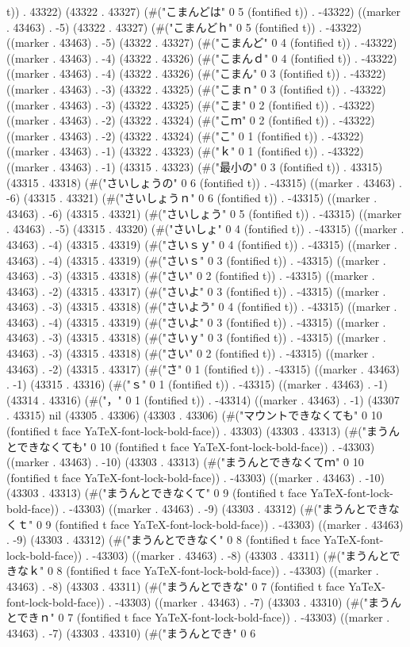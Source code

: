 t)) . 43322) (43322 . 43327) (#("こまんどは" 0 5 (fontified t)) . -43322) ((marker . 43463) . -5) (43322 . 43327) (#("こまんどｈ" 0 5 (fontified t)) . -43322) ((marker . 43463) . -5) (43322 . 43327) (#("こまんど" 0 4 (fontified t)) . -43322) ((marker . 43463) . -4) (43322 . 43326) (#("こまんｄ" 0 4 (fontified t)) . -43322) ((marker . 43463) . -4) (43322 . 43326) (#("こまん" 0 3 (fontified t)) . -43322) ((marker . 43463) . -3) (43322 . 43325) (#("こまｎ" 0 3 (fontified t)) . -43322) ((marker . 43463) . -3) (43322 . 43325) (#("こま" 0 2 (fontified t)) . -43322) ((marker . 43463) . -2) (43322 . 43324) (#("こｍ" 0 2 (fontified t)) . -43322) ((marker . 43463) . -2) (43322 . 43324) (#("こ" 0 1 (fontified t)) . -43322) ((marker . 43463) . -1) (43322 . 43323) (#("ｋ" 0 1 (fontified t)) . -43322) ((marker . 43463) . -1) (43315 . 43323) (#("最小の" 0 3 (fontified t)) . 43315) (43315 . 43318) (#("さいしょうの" 0 6 (fontified t)) . -43315) ((marker . 43463) . -6) (43315 . 43321) (#("さいしょうｎ" 0 6 (fontified t)) . -43315) ((marker . 43463) . -6) (43315 . 43321) (#("さいしょう" 0 5 (fontified t)) . -43315) ((marker . 43463) . -5) (43315 . 43320) (#("さいしょ" 0 4 (fontified t)) . -43315) ((marker . 43463) . -4) (43315 . 43319) (#("さいｓｙ" 0 4 (fontified t)) . -43315) ((marker . 43463) . -4) (43315 . 43319) (#("さいｓ" 0 3 (fontified t)) . -43315) ((marker . 43463) . -3) (43315 . 43318) (#("さい" 0 2 (fontified t)) . -43315) ((marker . 43463) . -2) (43315 . 43317) (#("さいよ" 0 3 (fontified t)) . -43315) ((marker . 43463) . -3) (43315 . 43318) (#("さいよう" 0 4 (fontified t)) . -43315) ((marker . 43463) . -4) (43315 . 43319) (#("さいよ" 0 3 (fontified t)) . -43315) ((marker . 43463) . -3) (43315 . 43318) (#("さいｙ" 0 3 (fontified t)) . -43315) ((marker . 43463) . -3) (43315 . 43318) (#("さい" 0 2 (fontified t)) . -43315) ((marker . 43463) . -2) (43315 . 43317) (#("さ" 0 1 (fontified t)) . -43315) ((marker . 43463) . -1) (43315 . 43316) (#("ｓ" 0 1 (fontified t)) . -43315) ((marker . 43463) . -1) (43314 . 43316) (#("，" 0 1 (fontified t)) . -43314) ((marker . 43463) . -1) (43307 . 43315) nil (43305 . 43306) (43303 . 43306) (#("マウントできなくても" 0 10 (fontified t face YaTeX-font-lock-bold-face)) . 43303) (43303 . 43313) (#("まうんとできなくても" 0 10 (fontified t face YaTeX-font-lock-bold-face)) . -43303) ((marker . 43463) . -10) (43303 . 43313) (#("まうんとできなくてｍ" 0 10 (fontified t face YaTeX-font-lock-bold-face)) . -43303) ((marker . 43463) . -10) (43303 . 43313) (#("まうんとできなくて" 0 9 (fontified t face YaTeX-font-lock-bold-face)) . -43303) ((marker . 43463) . -9) (43303 . 43312) (#("まうんとできなくｔ" 0 9 (fontified t face YaTeX-font-lock-bold-face)) . -43303) ((marker . 43463) . -9) (43303 . 43312) (#("まうんとできなく" 0 8 (fontified t face YaTeX-font-lock-bold-face)) . -43303) ((marker . 43463) . -8) (43303 . 43311) (#("まうんとできなｋ" 0 8 (fontified t face YaTeX-font-lock-bold-face)) . -43303) ((marker . 43463) . -8) (43303 . 43311) (#("まうんとできな" 0 7 (fontified t face YaTeX-font-lock-bold-face)) . -43303) ((marker . 43463) . -7) (43303 . 43310) (#("まうんとできｎ" 0 7 (fontified t face YaTeX-font-lock-bold-face)) . -43303) ((marker . 43463) . -7) (43303 . 43310) (#("まうんとでき" 0 6 